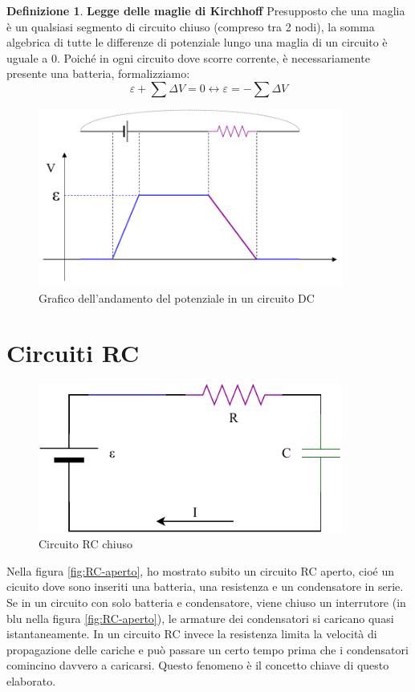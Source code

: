 \documentclass[a3paper, twoside, openany]{book}
\theoremstyle{definition}
\newtheorem{definition}{Definizione}
\begin{document}
\begin{definition}{\textbf{Legge delle maglie di Kirchhoff}}
Presupposto che una maglia è un qualsiasi segmento di circuito chiuso (compreso tra 2 nodi), la somma algebrica di tutte le differenze di potenziale lungo una maglia di un circuito è uguale a 0. Poiché in ogni circuito dove scorre corrente, è necessariamente presente una batteria, formalizziamo: $$\varepsilon+\sum{\Delta V}=0\longleftrightarrow \varepsilon=-\sum{\Delta V}$$
\end{definition}
\begin{figure}[htp]
    \centering
    \includegraphics[width=10cm]{Circuito RC-Maglia}
    \caption{Grafico dell'andamento del potenziale in un circuito DC}
    \label{fig:maglia}
\end{figure} \clearpage
\section{Circuiti RC}
\begin{figure}[htp]
    \centering
    \includegraphics[width=10cm]{Circuito RC-chiuso}
    \caption{Circuito RC chiuso}
    \label{fig:RC-chiuso}
\end{figure}

Nella figura \ref{fig:RC-aperto}, ho mostrato subito un circuito RC aperto, cioé un cicuito dove sono inseriti una batteria, una resistenza e un condensatore in serie. \\ Se in un circuito con solo batteria e condensatore, viene chiuso un interrutore (in blu nella figura \ref{fig:RC-aperto}), le armature dei condensatori si caricano quasi istantaneamente. In un circuito RC invece la resistenza limita la velocità di propagazione delle cariche e può passare un certo tempo prima che i condensatori comincino davvero a caricarsi. Questo fenomeno è il concetto chiave di questo elaborato.
\end{document}
